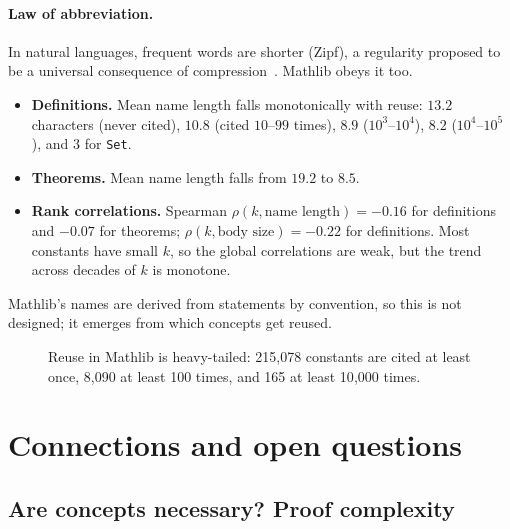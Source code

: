 \documentclass[11pt]{article}
\theoremstyle{remark}
\newcommand{\lean}[1]{\texttt{#1}}
\begin{document}
\paragraph{Law of abbreviation.} In natural languages, frequent words are shorter (Zipf),
a regularity proposed to be a universal consequence of compression~\cite{ferrer}. Mathlib
obeys it too.
\begin{itemize}
\item \textbf{Definitions.} Mean name length falls monotonically with reuse: $13.2$
  characters (never cited), $10.8$ (cited $10$--$99$ times), $8.9$ ($10^3$--$10^4$),
  $8.2$ ($10^4$--$10^5$), and $3$ for \lean{Set}.
\item \textbf{Theorems.} Mean name length falls from $19.2$ to $8.5$.
\item \textbf{Rank correlations.} Spearman $\rho(k,\text{name length})=-0.16$ for
  definitions and $-0.07$ for theorems; $\rho(k,\text{body size})=-0.22$ for definitions.
  Most constants have small $k$, so the global correlations are weak, but the trend
  across decades of $k$ is monotone.
\end{itemize}
Mathlib's names are derived from statements by convention, so this is not designed; it
emerges from which concepts get reused.

\begin{figure}[t]
\centering
{}
\caption{Reuse in Mathlib is heavy-tailed: 215{,}078 constants are cited at least once,
8{,}090 at least 100 times, and 165 at least 10{,}000 times.}
\label{fig:ccdf}
\end{figure}

\section{Connections and open questions}\label{sec:questions}

\subsection{Are concepts necessary? Proof complexity}
\end{document}
